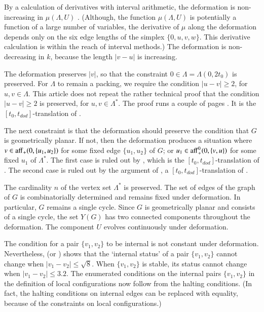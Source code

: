 By a calculation of derivatives with interval arithmetic,
the deformation is non-increasing in $\mu(\Lambda,U)$ \cite[Lemma~7.7]{arx}.  (Although, the function $\mu(\Lambda,U)$ is potentially a 
function of a large number of variables, the derivative of $\mu$
along the deformation depends only on the six edge lengths  of
the simplex $\{0,u,v,w\}$.  This derivative calculation is within
the reach of interval methods.)
The deformation is non-decreasing in $k$, because the length
$|v-u|$ is increasing.

The deformation preserves $|v|$,
so that the constraint $0\in\Lambda=\Lambda(0,2t_0)$ is preserved.
For $\Lambda$ to remain a packing, we require the condition
 $|u-v|\ge 2$, for $u,v\in \Lambda$.
This article does not repeat the rather technical proof that
the condition
 $|u-v|\ge 2$ is preserved, for $u,v\in\Lambda^*$.  The proof
runs a couple  of pages \cite[Lemma~7.6]{arx}.
It is the $[t_0,t_{dod}]$-translation of \cite[Lemma~12.20]{DCG}.

The next constraint is that the deformation should preserve the condition
that $G$ is geometrically planar.  
If not, then the deformation produces
a situation where $v\in {\operatorname{aff}}_+(0,\{u_1,u_2\})$ for some fixed edge $\{u_1,u_2\}$
of $G$; or $u_1\in {\operatorname{aff}}_+^0(0,\{v,u\})$ for some fixed $u_1$ of $\Lambda^*$.
The first case is ruled out by \cite[Remark~p.22]{arx}, which is the $[t_0,t_{dod}]$-translation of \cite[sec.12.7,p.132]{DCG}.  The second case is ruled out by 
the argument of \cite[p.27]{arx}, a $[t_0,t_{dod}]$-translation of 
\cite[sec.12.8,p.134]{DCG}.

The cardinality $n$ of the vertex set $\Lambda^*$ is preserved.
The set of edges of the graph of $G$ is combinatorially determined and
remains fixed under deformation.  In particular, $G$ remains a single
cycle.  Since $G$ is geometrically planar and consists of a single
cycle, the set $Y(G)$ has two connected components throughout the
deformation.  The component $U$ evolves continuously under deformation.   

The condition for a pair $\{v_1,v_2\}$ to be
internal is not constant under deformation.  Nevertheless,
\cite[p.23]{arx} (or \cite[p.132]{DCG}) 
shows that the `internal status' of a pair $\{v_1,v_2\}$
cannot change when $|v_1-v_2| \le \sqrt8$.  When $\{v_1,v_2\}$ is stable,
its status cannot change when $|v_1-v_2|\le 3.2$. 
The enumerated conditions on the
internal pairs $\{v_1,v_2\}$ in the definition of local configurations
now follow from the halting conditions. (In fact, the halting conditions on internal edges
can be replaced with equality, because of the
constraints on local configurations.)


